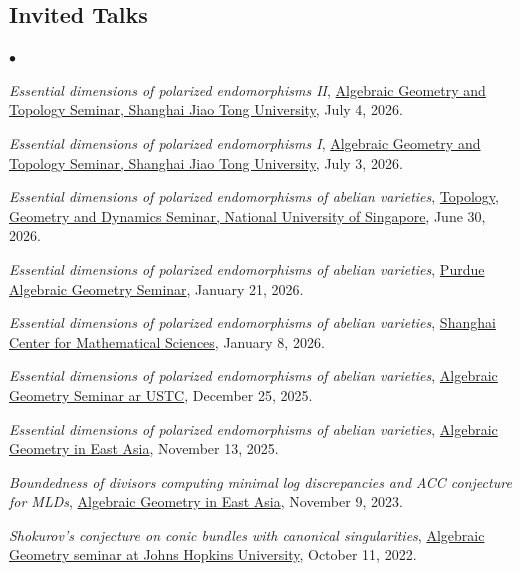 \documentclass[margin,line,pifont,palatino,courier]{res}
\newenvironment{list2}{
  \begin{list}{$\bullet$}{%
      \setlength{\itemsep}{0in}
      \setlength{\parsep}{0in} \setlength{\parskip}{0in}
      \setlength{\topsep}{0in} \setlength{\partopsep}{0in}
      \setlength{\leftmargin}{0.2in}}}{\end{list}}
\begin{document}
\begin{resume}
\section{\sc Invited Talks}
\begin{list2}
\item \emph{Essential dimensions of polarized endomorphisms II}, \href{https://www.math.sjtu.edu.cn/Default/seminarshow/tags/MDAwMDAwMDAwMLJ4hpaFyqF2}{Algebraic Geometry and Topology Seminar, Shanghai Jiao Tong University}, July 4, 2026.
\item \emph{Essential dimensions of polarized endomorphisms I}, \href{https://www.math.sjtu.edu.cn/Default/seminarshow/tags/MDAwMDAwMDAwMLJ4hpaFtKF2}{Algebraic Geometry and Topology Seminar, Shanghai Jiao Tong University}, July 3, 2026.
\item \emph{Essential dimensions of polarized endomorphisms of abelian varieties}, \href{https://www.math.nus.edu.sg/category/events/colloquia-seminars/topology-geometry-dynamics/}{Topology, Geometry and Dynamics Seminar, National University of Singapore}, June 30, 2026.
\item \emph{Essential dimensions of polarized endomorphisms of abelian varieties}, \href{https://sites.google.com/view/purduealgebraicgeometryseminar/home}{Purdue Algebraic Geometry Seminar}, January 21, 2026.
\item \emph{Essential dimensions of polarized endomorphisms of abelian varieties}, \href{https://scms.fudan.edu.cn/info/6223/11811.htm}{Shanghai Center for Mathematical Sciences}, January 8, 2026.
\item \emph{Essential dimensions of polarized endomorphisms of abelian varieties}, \href{https://math.ustc.edu.cn/2025/1222/c18702a717212/page.htm}{Algebraic Geometry Seminar ar USTC}, December 25, 2025.
\item \emph{Essential dimensions of polarized endomorphisms of abelian varieties}, \href{https://sites.google.com/ncts.ntu.edu.tw/2025-algebraic-geometry-in/2025-agea}{Algebraic Geometry in East Asia}, November 13, 2025.
\item \emph{Boundedness of divisors computing minimal log discrepancies and ACC conjecture for MLDs}, \href{http://events.kias.re.kr/h/AGEA23/?pageNo=4999}{Algebraic Geometry in East Asia}, November 9, 2023.
\item \emph{Shokurov's conjecture on conic bundles with canonical singularities}, \href{https://mathematics.jhu.edu/event/algebraic-geometry-seminar-yujie-luo-johns-hopkins/}{Algebraic Geometry seminar at Johns Hopkins University}, October 11, 2022.

\end{list2}
\end{resume}
\end{document}
